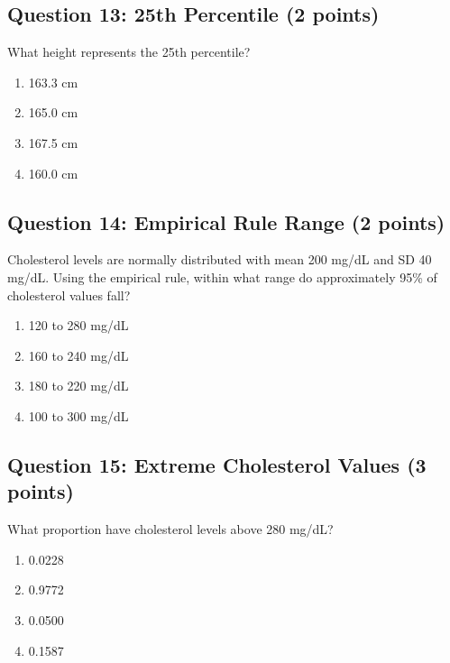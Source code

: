 \documentclass[11pt]{article}
\begin{document}
\vspace{0.5cm}

\subsection*{Question 13: 25th Percentile (2 points)}

What height represents the 25th percentile?

\begin{enumerate}[label=\Alph*)]
\item 163.3 cm
\item 165.0 cm
\item 167.5 cm
\item 160.0 cm
\end{enumerate}

\vspace{0.5cm}

\subsection*{Question 14: Empirical Rule Range (2 points)}

Cholesterol levels are normally distributed with mean 200 mg/dL and SD 40 mg/dL. Using the empirical rule, within what range do approximately 95\% of cholesterol values fall?

\begin{enumerate}[label=\Alph*)]
\item 120 to 280 mg/dL
\item 160 to 240 mg/dL
\item 180 to 220 mg/dL
\item 100 to 300 mg/dL
\end{enumerate}

\vspace{0.5cm}

\subsection*{Question 15: Extreme Cholesterol Values (3 points)}

What proportion have cholesterol levels above 280 mg/dL?

\begin{enumerate}[label=\Alph*)]
\item 0.0228
\item 0.9772
\item 0.0500
\item 0.1587
\end{enumerate}
\end{document}
